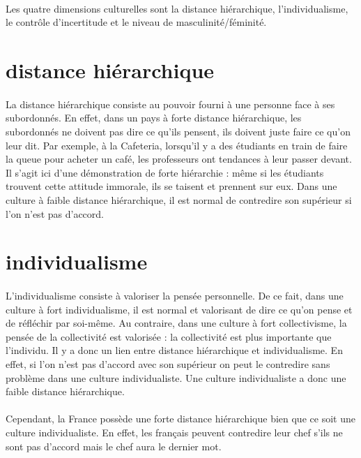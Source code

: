 \paragraph{} Les quatre dimensions culturelles sont la distance hiérarchique,
l’individualisme, le contrôle d’incertitude et le niveau de
masculinité/féminité.

\section{distance hiérarchique}

\paragraph{} La distance hiérarchique consiste au pouvoir fourni à une personne
face à ses subordonnés. En effet, dans un pays à forte distance hiérarchique,
les subordonnés ne doivent pas dire ce qu’ils pensent, ils doivent juste faire
ce qu’on leur dit. Par exemple, à la Cafeteria, lorsqu’il y a des étudiants en
train de faire la queue pour acheter un café, les professeurs ont tendances à
leur passer devant. Il s’agit ici d’une démonstration de forte hiérarchie :
même si les étudiants trouvent cette attitude immorale, ils se taisent et
prennent sur eux. Dans une culture à faible distance hiérarchique, il est
normal de contredire son supérieur si l’on n’est pas d’accord.

\section{individualisme}

\paragraph{} L’individualisme consiste à valoriser la pensée personnelle. De ce
fait, dans une culture à fort individualisme, il est normal et valorisant de
dire ce qu’on pense et de réfléchir par soi-même. Au contraire, dans une
culture à fort collectivisme, la pensée de la collectivité est valorisée : la
collectivité est plus importante que l’individu. Il y a donc un lien entre
distance hiérarchique et individualisme. En effet, si l’on n’est pas d’accord
avec son supérieur on peut le contredire sans problème dans une culture
individualiste. Une culture individualiste a donc une faible distance
hiérarchique.

\paragraph{} Cependant, la France possède une forte distance hiérarchique bien
que ce soit une culture individualiste. En effet, les français peuvent
contredire leur chef s’ils ne sont pas d’accord mais le chef aura le dernier
mot.

